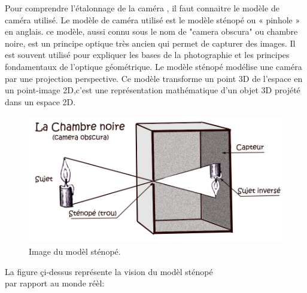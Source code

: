 Pour comprendre l'étalonnage de la caméra , il faut connaitre le modèle de caméra utilisé.
Le modèle de caméra utilisé est le modèle sténopé ou « pinhole » en anglais.
ce modèle, aussi connu sous le nom de "camera obscura" ou chambre noire, est un principe optique très ancien qui permet de capturer des images. Il est souvent utilisé pour expliquer les bases de la photographie et les principes fondamentaux de l'optique géométrique. \cite{orteu_calibrage_nodate}
Le modèle sténopé modélise une caméra par une projection perspective. Ce modèle transforme un point 3D de l'espace  en un point-image 2D,c'est une représentation mathématique d'un objet 3D projété dans un espace 2D.\\
 \vspace{-0.3 cm}
 \begin{figure}[h]
 	\centering
 	\includegraphics[scale=0.35]{image/chambre-noire.jpg}
 	\decoRule
 	\caption[Modèl sténopé]{Image du modèl sténopé.}
 	\label{fig:Modèl sténopé}
 \end{figure}
  
La figure çi-dessus représente la vision du modèl sténopé \\
par rapport au monde réèl:\\

